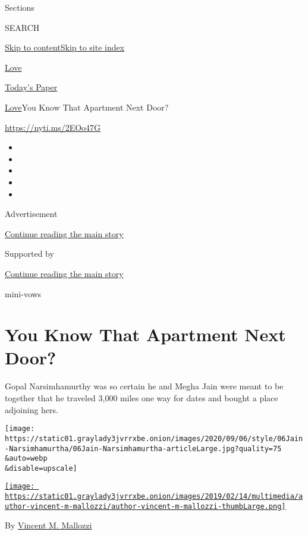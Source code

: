 Sections

SEARCH

\protect\hyperlink{site-content}{Skip to
content}\protect\hyperlink{site-index}{Skip to site index}

\href{https://www.nytimes3xbfgragh.onion/section/fashion/weddings}{Love}

\href{https://myaccount.nytimes3xbfgragh.onion/auth/login?response_type=cookie\&client_id=vi}{}

\href{https://www.nytimes3xbfgragh.onion/section/todayspaper}{Today's
Paper}

\href{/section/fashion/weddings}{Love}\textbar{}You Know That Apartment
Next Door?

\url{https://nyti.ms/2EOo47G}

\begin{itemize}
\item
\item
\item
\item
\item
\end{itemize}

Advertisement

\protect\hyperlink{after-top}{Continue reading the main story}

Supported by

\protect\hyperlink{after-sponsor}{Continue reading the main story}

mini-vows

\hypertarget{you-know-that-apartment-next-door}{%
\section{You Know That Apartment Next
Door?}\label{you-know-that-apartment-next-door}}

Gopal Narsimhamurthy was so certain he and Megha Jain were meant to be
together that he traveled 3,000 miles one way for dates and bought a
place adjoining hers.

\texttt{[image: https://static01.graylady3jvrrxbe.onion/images/2020/09/06/style/06Jain-Narsimhamurtha/06Jain-Narsimhamurtha-articleLarge.jpg?quality=75\\\&auto=webp\\\&disable=upscale]}

\href{https://www.nytimes3xbfgragh.onion/by/vincent-m-mallozzi}{\texttt{[image: https://static01.graylady3jvrrxbe.onion/images/2019/02/14/multimedia/author-vincent-m-mallozzi/author-vincent-m-mallozzi-thumbLarge.png]}}

By
\href{https://www.nytimes3xbfgragh.onion/by/vincent-m-mallozzi}{Vincent
M. Mallozzi}

